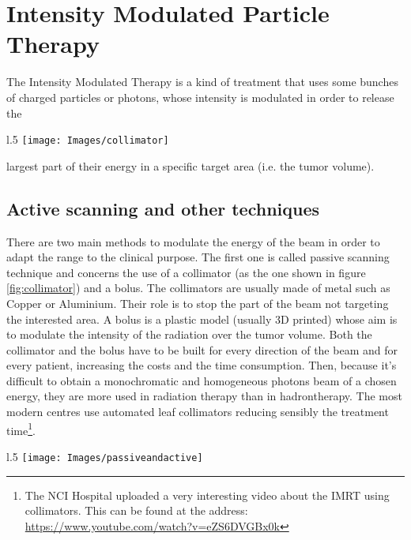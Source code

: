 \documentclass[12pt, a4paper, twoside]{book}
\begin{document}
\section{Intensity Modulated Particle Therapy}
The Intensity Modulated Therapy is a kind of treatment that uses some bunches of charged particles or photons, whose intensity is modulated in order to release the
\begin{wrapfigure}{l}{.5\textwidth}
{\texttt{[image: Images/collimator]}}
\caption{Multileaf collimator for the shaping of the radiation beam}
\label{fig:collimator}
\end{wrapfigure}
\noindent largest part of their energy in a specific target area (i.e. the tumor volume).

\subsection{Active scanning and other techniques}
\label{activeScanning}
There are two main methods to modulate the energy of the beam in order to adapt the range to the clinical purpose. The first one is called passive scanning technique and concerns the use of a collimator (as the one shown in figure \ref{fig:collimator}) and a bolus. The collimators are usually made of metal such as Copper or Aluminium. Their role is to stop the part of the beam not targeting the interested area. A bolus is a plastic model (usually 3D printed) whose aim is to modulate the intensity of the radiation over the tumor volume. Both the collimator and the bolus have to be built for every direction of the beam and for every patient, increasing the costs and the time consumption. 
Then, because it's difficult to obtain a monochromatic and homogeneous photons beam of a chosen energy, they are more used in radiation therapy than in hadrontherapy.
The most modern centres use automated leaf collimators reducing sensibly the treatment time\footnote{The NCI Hospital uploaded a very interesting video about the IMRT using collimators. This can be found at the address: \url{https://www.youtube.com/watch?v=eZS6DVGBx0k}}. 
\begin{wrapfigure}{l}{.5\textwidth}
{\texttt{[image: Images/passiveandactive]}}
\caption{Comparison between passive and active beam scanning}
\label{fig:actandpas}
\end{wrapfigure}
\end{document}
